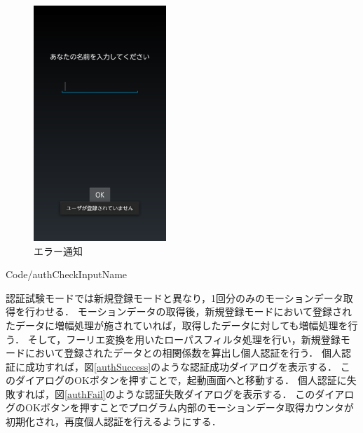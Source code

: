 \documentclass[11pt]{jreport}
\renewcommand{\slash}{/}
\begin{document}
\begin{figure}[htbp]
            \begin{minipage}{0.33\hsize}
                \begin{center}
                    \includegraphics[width=5cm, bb=0 0 540 960]{AuthNameInputError.pdf}
                \end{center}
                \caption{エラー通知}
                \label{authNameInputError}
            \end{minipage}
        \end{figure}

        \newpage
        
        {Code\slash authCheckInputName}

        認証試験モードでは新規登録モードと異なり，1回分のみのモーションデータ取得を行わせる．
        モーションデータの取得後，新規登録モードにおいて登録されたデータに増幅処理が施されていれば，取得したデータに対しても増幅処理を行う．
        そして，フーリエ変換を用いたローパスフィルタ処理を行い，新規登録モードにおいて登録されたデータとの相関係数を算出し個人認証を行う．
        個人認証に成功すれば，図\ref{authSuccess}のような認証成功ダイアログを表示する．
        このダイアログのOKボタンを押すことで，起動画面へと移動する．
        個人認証に失敗すれば，図\ref{authFail}のような認証失敗ダイアログを表示する．
        このダイアログのOKボタンを押すことでプログラム内部のモーションデータ取得カウンタが初期化され，再度個人認証を行えるようにする．
\end{document}
